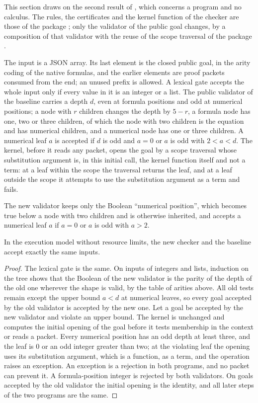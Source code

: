 This section draws on the second result of , which
concerns a program and no calculus. The rules, the certificates and the
kernel function of the checker are those of the package
; only the validator of the public goal
changes, by a composition of that validator with the reuse of the scope
traversal of the package .

The input is a JSON array. Its last element is the closed public goal, in
the arity coding of the native formulas, and the earlier elements are proof
packets consumed from the end; an unused prefix is allowed. A lexical gate
accepts the whole input only if every value in it is an integer or a list.
The public validator of the baseline carries a depth $d$, even at formula
positions and odd at numerical positions; a node with $r$ children changes
the depth by $5-r$, a formula node has one, two or three children, of which
the node with two children is the equation and has numerical children, and
a numerical node has one or three children. A numerical leaf $a$ is accepted
if $d$ is odd and $a=0$ or $a$ is odd with $2<a<d$. The kernel, before it
reads any packet, opens the goal by a scope traversal whose substitution
argument is, in this initial call, the kernel function itself and not a
term: at a leaf within the scope the traversal returns the leaf, and at a
leaf outside the scope it attempts to use the substitution argument as a
term and fails.

The new validator keeps only the Boolean ``numerical position'', which
becomes true below a node with two children and is otherwise inherited, and
accepts a numerical leaf $a$ if $a=0$ or $a$ is odd with $a>2$.

\begin{theorem}
\label{comp:thm:scope}
In the execution model without resource limits, the new checker and the
baseline accept exactly the same inputs.
\end{theorem}

\begin{proof}
The lexical gate is the same. On inputs of integers and lists, induction on
the tree shows that the Boolean of the new validator is the parity of the
depth of the old one wherever the shape is valid, by the table of arities
above. All old tests remain except the upper bound $a<d$ at numerical
leaves, so every goal accepted by the old validator is accepted by the new
one. Let a goal be accepted by the new validator and violate an upper
bound. The kernel is unchanged and computes the initial opening of the goal
before it tests membership in the context or reads a packet. Every
numerical position has an odd depth at least three, and the leaf is $0$ or
an odd integer greater than two; at the violating leaf the opening uses its
substitution argument, which is a function, as a term, and the operation
raises an exception. An exception is a rejection in both programs, and no
packet can prevent it. A formula-position integer is rejected by both
validators. On goals accepted by the old validator the initial opening is
the identity, and all later steps of the two programs are the same.
\end{proof}

